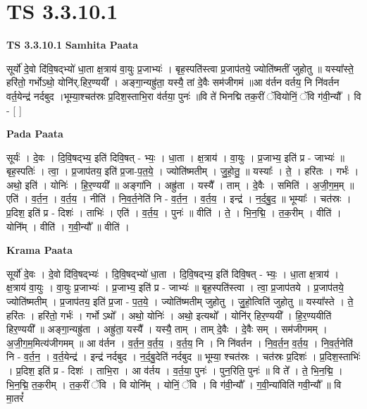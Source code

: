 \documentclass[17pt]{extarticle}
\begin{document}
\section{ TS 3.3.10.1 }

\textbf{TS 3.3.10.1 } \newline
\textbf{Samhita Paata} \newline

सूर्यो॑ दे॒वो दि॑वि॒षद्भ्यो॑ धा॒ता क्ष॒त्राय॑ वा॒युः प्र॒जाभ्यः॑ । बृह॒स्पति॑स्त्वा प्र॒जाप॑तये॒ ज्योति॑ष्मतीं जुहोतु ॥ यस्या᳚स्ते॒ हरि॑तो॒ गर्भोऽथो॒ योनि॑र्.हिर॒ण्ययी᳚ । अङ्गा॒न्यह्रु॑ता॒ यस्यै॒ तां दे॒वैः सम॑जीगमं ॥आ व॑र्तन वर्तय॒ नि नि॑वर्तन वर्त॒येन्द्र॑ नर्दबुद ।भूम्या॒श्चत॑स्रः प्र॒दिश॒स्ताभि॒रा व॑र्तया॒ पुनः॑ ॥वि ते॑ भिनद्मि तक॒रीं ॅवियोनिं॒ ॅवि ग॑वी॒न्यौ᳚ । वि - [  ] \newline

\textbf{Pada Paata} \newline

सूर्यः॑ । दे॒वः । दि॒वि॒षद्भ्य॒ इति॑ दिवि॒षत् - भ्यः॒ । धा॒ता । क्ष॒त्राय॑ । वा॒युः । प्र॒जाभ्य॒ इति॑ प्र - जाभ्यः॑ ॥ बृह॒स्पतिः॑ । त्वा॒ । प्र॒जाप॑तय॒ इति॑ प्र॒जा-प॒त॒ये॒ । ज्योति॑ष्मतीम् । जु॒हो॒तु॒ ॥ यस्याः᳚ । ते॒ । हरि॑तः । गर्भः॑ । अथो॒ इति॑ । योनिः॑ । हि॒र॒ण्ययी᳚ ॥ अङ्गा॑नि । अह्रु॑ता । यस्यै᳚ । ताम् । दे॒वैः । समिति॑ । अ॒जी॒ग॒म॒म् ॥ एति॑ । व॒र्त॒न॒ । व॒र्त॒य॒ । नीति॑ । नि॒व॒र्त॒नेति॑ नि - व॒र्त॒न॒ । व॒र्त॒य॒ । इन्द्र॑ । न॒र्द॒बु॒द॒ ॥ भूम्याः᳚ । चत॑स्रः । प्र॒दिश॒ इति॑ प्र - दिशः॑ । ताभिः॑ । एति॑ । व॒र्त॒य॒ । पुनः॑ ॥ वीति॑ । ते॒ । भि॒न॒द्मि॒ । त॒क॒रीम् । वीति॑ । योनि᳚म् । वीति॑ । ग॒वी॒न्यौ᳚ ॥ वीति॑ ।  \newline


\textbf{Krama Paata} \newline

सूर्यो॑ दे॒वः । दे॒वो दि॑वि॒षद्भ्यः॑ । दि॒वि॒षद्भ्यो॑ धा॒ता । दि॒वि॒षद्भ्य॒ इति॑ दिवि॒षत् - भ्यः॒ । धा॒ता क्ष॒त्राय॑ । क्ष॒त्राय॑ वा॒युः । वा॒युः प्र॒जाभ्यः॑ । प्र॒जाभ्य॒ इति॑ प्र - जाभ्यः॑ ॥ बृह॒स्पति॑स्त्वा । त्वा॒ प्र॒जाप॑तये । प्र॒जाप॑तये॒ ज्योति॑ष्मतीम् । प्र॒जाप॑तय॒ इति॑ प्र॒जा - प॒त॒ये॒ । ज्योति॑ष्मतीम् जुहोतु । जु॒हो॒त्विति॑ जुहोतु ॥ यस्या᳚स्ते । ते॒ हरि॑तः । हरि॑तो॒ गर्भः॑ । गर्भो ऽथो᳚ । अथो॒ योनिः॑ । अथो॒ इत्यथो᳚ । योनि॑र् हिर॒ण्ययी᳚ । हि॒र॒ण्ययीति॑ हिर॒ण्ययी᳚ ॥ अङ्गा॒न्यह्रु॑ता । अह्रु॑ता॒ यस्यै᳚ । यस्यै॒ ताम् । ताम् दे॒वैः । दे॒वैः सम् । सम॑जीगमम् । अ॒जी॒ग॒म॒मित्य॑जीगमम् ॥ आ व॑र्तन । व॒र्त॒न॒ व॒र्त॒य॒ । व॒र्त॒य॒ नि । नि नि॑वर्तन । नि॒व॒र्त॒न॒ व॒र्त॒य॒ । नि॒व॒र्त॒नेति॑ नि - व॒र्त॒न॒ । व॒र्त॒येन्द्र॑ । इन्द्र॑ नर्दबुद । न॒र्द॒बु॒देति॑ नर्दबुद ॥ भूम्या॒ श्चत॑स्रः । चत॑स्रः प्र॒दिशः॑ । प्र॒दिश॒स्ताभिः॑ । प्र॒दिश॒ इति॑ प्र - दिशः॑ । ताभि॒रा । आ व॑र्तय । व॒र्त॒या॒ पुनः॑ । पुन॒रिति॒ पुनः॑ ॥ वि ते᳚ । ते॒ भि॒न॒द्मि॒ । भि॒न॒द्मि॒ त॒क॒रीम् । त॒क॒रीं ॅवि । वि योनि᳚म् । योनिं॒ ॅवि । वि ग॑वी॒न्यौ᳚ । ग॒वी॒न्या॑विति॑ गवी॒न्यौ᳚ ॥ वि मा॒तरं᳚ \newline
\end{document}
